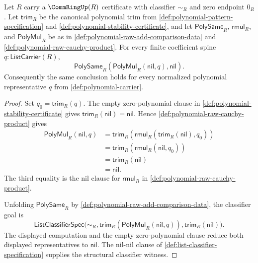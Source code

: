 \begin{theorem}
\label{thm:polynomial-multiplication-left-zero-absorption}
Let $R$ carry a $\CommRingUp(R)$ certificate with classifier $\sim_R$ and zero endpoint $0_R$. Let $\mathsf{trim}_R$ be the canonical polynomial trim from \autoref{def:polynomial-pattern-specification} and \autoref{def:polynomial-stability-certificate}, and let $\mathsf{PolySame}_R$, $\mathsf{rmul}_R$, and $\mathsf{PolyMul}_R$ be as in \autoref{def:polynomial-raw-add-comparison-data} and \autoref{def:polynomial-raw-cauchy-product}. For every finite coefficient spine $q:\mathsf{ListCarrier}(R)$,
$$
\mathsf{PolySame}_R(\mathsf{PolyMul}_R(\mathsf{nil},q),\mathsf{nil}).
$$
Consequently the same conclusion holds for every normalized polynomial representative $q$ from \autoref{def:polynomial-carrier}.
\end{theorem}
\begin{proof}
Set $q_0=\mathsf{trim}_R(q)$. The empty zero-polynomial clause in \autoref{def:polynomial-stability-certificate} gives $\mathsf{trim}_R(\mathsf{nil})=\mathsf{nil}$. Hence \autoref{def:polynomial-raw-cauchy-product} gives
$$
\begin{aligned}
\mathsf{PolyMul}_R(\mathsf{nil},q)
&=\mathsf{trim}_R(\mathsf{rmul}_R(\mathsf{trim}_R(\mathsf{nil}),q_0))\\
&=\mathsf{trim}_R(\mathsf{rmul}_R(\mathsf{nil},q_0))\\
&=\mathsf{trim}_R(\mathsf{nil})\\
&=\mathsf{nil}.
\end{aligned}
$$
The third equality is the nil clause for $\mathsf{rmul}_R$ in \autoref{def:polynomial-raw-cauchy-product}.

Unfolding $\mathsf{PolySame}_R$ by \autoref{def:polynomial-raw-add-comparison-data}, the classifier goal is
$$
\mathsf{ListClassifierSpec}\bigl(\sim_R,\mathsf{trim}_R(\mathsf{PolyMul}_R(\mathsf{nil},q)),\mathsf{trim}_R(\mathsf{nil})\bigr).
$$
The displayed computation and the empty zero-polynomial clause reduce both displayed representatives to $\mathsf{nil}$. The nil-nil clause of \autoref{def:list-classifier-specification} supplies the structural classifier witness.
\end{proof}

